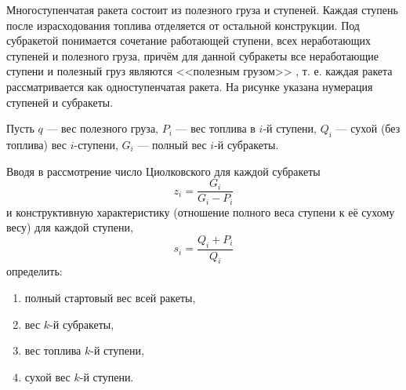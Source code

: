 Многоступенчатая ракета состоит из полезного груза и ступеней.
Каждая ступень после израсходования топлива отделяется от остальной конструкции.
Под субракетой понимается сочетание работающей ступени,
всех неработающих ступеней и полезного груза,
причём для данной субракеты все неработающие ступени и полезный груз
являются <<полезным грузом>> , т. е. каждая ракета
рассматривается как одноступенчатая ракета.
На рисунке указана нумерация ступеней и субракеты.

Пусть $q$ --- вес полезного груза, $P_i$ --- вес топлива в $i$-й ступени,
$Q_i$ --- сухой (без топлива) вес $i$-ступени,
$G_i$ --- полный вес $i$-й субракеты.

Вводя в рассмотрение число Циолковского для каждой субракеты
$$z_i = \frac{G_i}{G_i - P_i}$$
и конструктивную характеристику
(отношение полного веса ступени к её сухому весу)
для каждой ступени,
$$s_i = \frac{Q_i + P_i}{Q_i}$$
определить:
\begin{enumerate}
\item полный стартовый вес всей ракеты,
\item вес $k$-й субракеты,
\item вес топлива $k$-й ступени,
\item сухой вес $k$-й ступени.
\end{enumerate}
